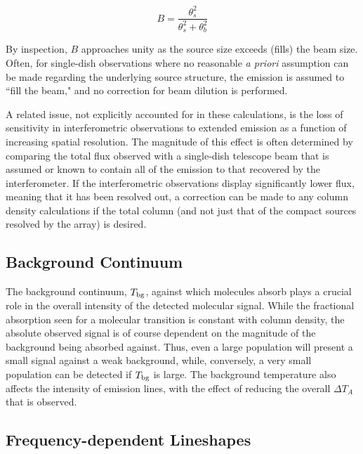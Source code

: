 \documentclass[twocolumn]{aastex631}
\begin{document}
\begin{equation}
B = \frac{\theta_s^2}{\theta_s^2 + \theta_b^2}
\label{beamdilution}
\end{equation}

By inspection, $B$ approaches unity as the source size exceeds (fills) the beam size.  Often, for single-dish observations where no reasonable \emph{a priori} assumption can be made regarding the underlying source structure, the emission is assumed to ``fill the beam," and no correction for beam dilution is performed.

A related issue, not explicitly accounted for in these calculations, is the loss of sensitivity in interferometric observations to extended emission as a function of increasing spatial resolution.  The magnitude of this effect is often determined by comparing the total flux observed with a single-dish telescope beam that is assumed or known to contain all of the emission to that recovered by the interferometer.  If the interferometric observations display significantly lower flux, meaning that it has been resolved out, a correction can be made to any column density calculations if the total column (and not just that of the compact sources resolved by the array) is desired.

\subsection{Background Continuum}

The background continuum, $T_{\rm{bg}}$, against which molecules absorb plays a crucial role in the overall intensity of the detected molecular signal.  While the fractional absorption seen for a molecular transition is constant with column density, the absolute observed signal is of course dependent on the magnitude of the background being absorbed against.  Thus, even a large population will present a small signal against a weak background, while, conversely, a very small population can be detected if $T_{\rm{bg}}$ is large.  The background temperature also affects the intensity of emission lines, with the effect of reducing the overall $\Delta T_A$ that is observed.

\subsection{Frequency-dependent Lineshapes}
\label{subsec:velocity}
\end{document}
